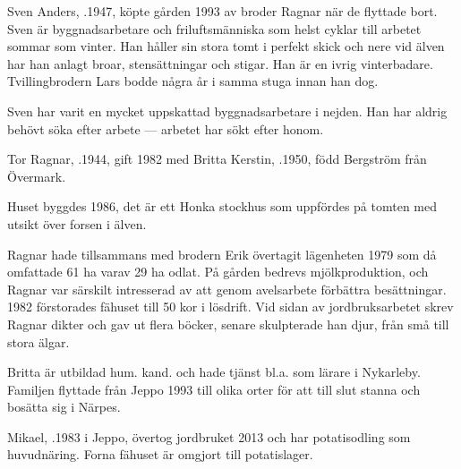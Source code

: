%



%
Sven Anders, .1947, köpte gården 1993 av broder Ragnar när de flyttade bort. Sven är byggnadsarbetare och friluftsmänniska som helst cyklar till arbetet sommar som vinter. Han håller sin stora tomt i perfekt skick och nere vid älven har han anlagt broar, stensättningar och stigar. Han är en ivrig vinterbadare. Tvillingbrodern Lars bodde några år i samma stuga innan han dog.

Sven har varit en mycket uppskattad byggnadsarbetare i nejden. Han har aldrig behövt söka efter arbete --- arbetet har sökt efter honom.



%
Tor Ragnar, .1944, gift 1982 med Britta Kerstin, .1950, född Bergström från Övermark.
\begin{jhchildren}
  \item {}
  \item {}
\end{jhchildren}
Huset byggdes 1986, det är ett Honka stockhus som uppfördes på tomten med utsikt över forsen i älven.

Ragnar hade tillsammans med brodern Erik övertagit lägenheten 1979 som då omfattade 61 ha varav 29 ha odlat. På gården bedrevs mjölkproduktion, och Ragnar var särskilt intresserad av att genom avelsarbete förbättra besättningar. 1982 förstorades fähuset till 50 kor i lösdrift. Vid sidan av jordbruksarbetet skrev Ragnar dikter och gav ut flera böcker, senare skulpterade han djur, från små till stora älgar.

Britta är utbildad hum. kand. och hade tjänst bl.a. som lärare i Nykarleby. Familjen flyttade från Jeppo 1993 till olika orter för att till slut stanna och bosätta sig i Närpes.



%


%
Mikael, .1983 i Jeppo, övertog jordbruket 2013 och har potatisodling som huvudnäring. Forna fähuset är omgjort till potatislager.\jhvspace{}


